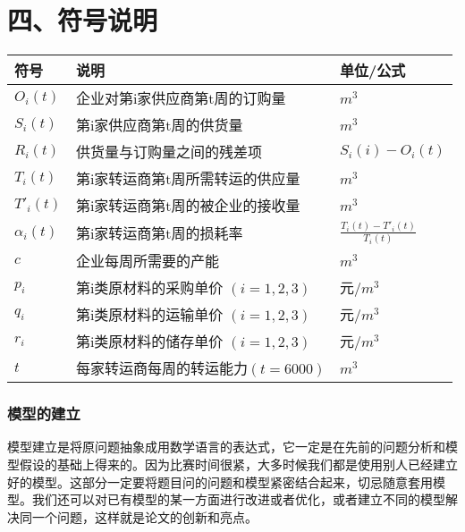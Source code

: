 \documentclass{my_paper}
\begin{document}
\section{四、符号说明}
\begin{table}[htbp]%
    \centering
    \begin{tabular}{p{2.0cm}<{\centering}p{9.0cm}<{\centering}p{2.0cm}<{\flushright}}
    \hline
    符号 & 说明 & 单位/公式 \\ %
    \hline
    $ O_{i}(t) $ & 企业对第i家供应商第t周的订购量 &  $ m^3 $ \\ 
    $ S_{i}(t) $ & 第i家供应商第t周的供货量 &  $m^3$ \\ 
    $ R_{i}(t) $ &  供货量与订购量之间的残差项 & $S_i(i) - O_{i}(t)$  \\  
    $ T_{i}(t) $ & 第i家转运商第t周所需转运的供应量 &  $m^3$ \\ 
    $ T'_{i}(t) $ & 第i家转运商第t周的被企业的接收量 & $m^3$ \\
    $ \alpha_{i}(t) $ & 第i家转运商第t周的损耗率  & $\frac{T_{i}(t) - T'_{i}(t)}{T_{i}(t)}$ \\
    
    $ c $ &  企业每周所需要的产能 & $m^3$ \\
    $ p_{i} $ & 第i类原材料的采购单价 $(i=1,2,3)$ & 元/$m^3$ \\
    $ q_{i} $ & 第i类原材料的运输单价 $(i=1,2,3)$ & 元/$m^3$ \\
    $ r_{i} $ & 第i类原材料的储存单价 $(i=1,2,3)$ & 元/$m^3$ \\
    $ t $ & 每家转运商每周的转运能力$(t=6000)$ & $m^3$ \\
    
    \hline
    \end{tabular}
\end{table}

\iffalse
本部分是对模型中使用的重要变量进行说明，一般排版时要放到一张表格中。
注意：第一：不需要把所有变量都放到这个表里面，模型中用到的临时变量可以不放。第二：下文中首次出现这些变量时也要进行解释，不然会降低文章的可读性。
\fi 


\iffalse
\subsubsection{模型的建立}
模型建立是将原问题抽象成用数学语言的表达式，它一定是在先前的问题分析和模型假设的基础上得来的。因为比赛时间很紧，大多时候我们都是使用别人已经建立好的模型。这部分一定要将题目问的问题和模型紧密结合起来，切忌随意套用模型。我们还可以对已有模型的某一方面进行改进或者优化，或者建立不同的模型解决同一个问题，这样就是论文的创新和亮点。
\end{document}
